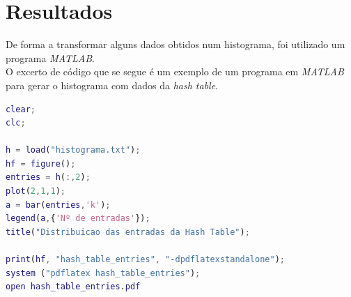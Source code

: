 \chapter{Resultados}
\label{resultados}
De forma a transformar alguns dados obtidos num histograma, foi utilizado um programa \textit{MATLAB}.\\
O excerto de código que se segue é um exemplo de um programa em \textit{MATLAB} para gerar o histograma com dados da \textit{hash table}.
	\begin{lstlisting}[language=Matlab]
clear;
clc;

h = load("histograma.txt");
hf = figure();
entries = h(:,2);
plot(2,1,1);
a = bar(entries,'k');
legend(a,{'Nº de entradas'});
title("Distribuicao das entradas da Hash Table");

print(hf, "hash_table_entries", "-dpdflatexstandalone");
system ("pdflatex hash_table_entries");
open hash_table_entries.pdf
	\end{lstlisting}
\pagebreak
